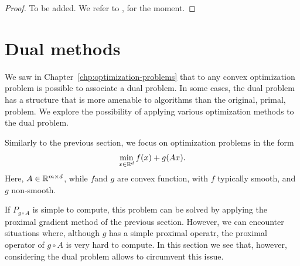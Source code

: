 \documentclass{report}
\begin{document}
\begin{proof}
	To be added. We refer to \cite{fawziLecture}, for the moment.
\end{proof}


\section{Dual methods}

We saw in Chapter~\ref{chp:optimization-problems} that to any convex optimization problem is possible to associate a dual problem.
In some cases, the dual problem has a structure that is more amenable to algorithms than the original, primal, problem. We explore the possibility of applying various optimization methods to the dual problem.

Similarly to the previous section, we focus on optimization problems in the form
\begin{equation}
	\label{eq:f+gA-dual}
	\min_{x\in\mathbb{R}^d} f(x) + g(Ax).
\end{equation}
Here,  $A\in \mathbb{R}^{m\times d}$, while $f$and $g$ are convex function, with $f$ typically smooth, and $g$ non-smooth.

If $P_{g\circ A}$ is simple to compute, this problem can be solved by applying the proximal gradient method of the previous section. 
However, we can encounter situations where, although $g$ has a simple proximal operatr, the proximal operator of ${g\circ A}$ is very hard to compute.
In this section we see that, however, considering the dual problem allows to circumvent this issue.
\end{document}
